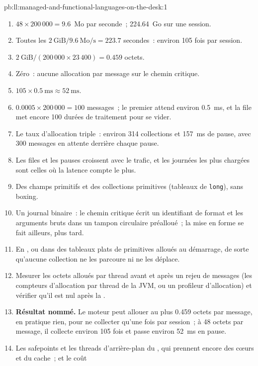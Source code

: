 \begin{solution}{pb:ll:managed-and-functional-languages-on-the-desk:1}
\begin{enumerate}
\item $48 \times 200\,000 = 9.6$~Mo par seconde~; 224.64~Go sur une session.
\item Toutes les $2~\text{GiB}/9.6~\text{Mo/s} = 223.7$ secondes~: environ 105 fois par session.
\item $2~\text{GiB}/(200\,000 \times 23\,400) = 0.459$ octets.
\item Zéro~: aucune allocation par message sur le chemin critique.
\item $105 \times \qty{0.5}{\milli\second} \approx \qty{52}{\milli\second}$.
\item $0.0005 \times 200\,000 = 100$ messages~; le premier attend environ \qty{0.5}{\milli\second}, et la file met
encore 100 durées de traitement pour se vider.
\item Le taux d'allocation triple~: environ 314 collections et \qty{157}{\milli\second} de pause, avec 300 messages en attente derrière chaque
pause.
\item Les files et les pauses croissent avec le trafic, et les journées les plus chargées sont celles où la latence compte le plus.
\item Des champs primitifs et des collections primitives (tableaux de \texttt{long}), sans boxing.
\item Un journal binaire~: le chemin critique écrit un identifiant de format et les arguments bruts dans un tampon circulaire préalloué~; la mise en forme se fait
ailleurs, plus tard.
\item En , ou dans des tableaux plats de primitives alloués au démarrage, de sorte qu'aucune collection ne les parcoure ni ne les déplace.
\item Mesurer les octets alloués par thread avant et après un rejeu de messages (les compteurs d'allocation par thread de la JVM, ou
un profileur d'allocation) et vérifier qu'il est nul après la .
\item \textbf{Résultat nommé.} Le moteur peut allouer au plus 0.459 octets par message, en pratique rien, pour ne collecter qu'une fois par
session~; à 48 octets par message, il collecte environ 105 fois et passe environ \qty{52}{\milli\second} en pause.
\item Les safepoints et les threads d'arrière-plan du , qui prennent encore des cœurs et du cache~; et le coût

\end{enumerate}
\end{solution}
